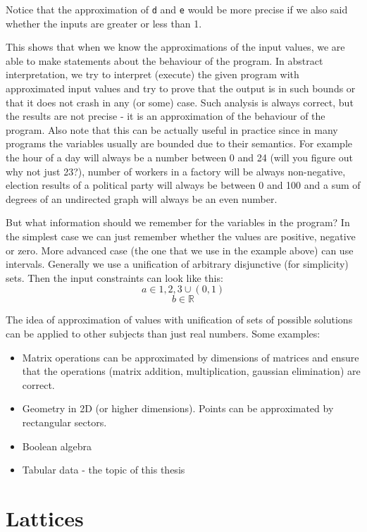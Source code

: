 Notice that the approximation of \verb|d| and \verb|e| would be more precise if we also said whether the inputs
are greater or less than 1.

This shows that when we know the approximations of the input values, we are able to make statements about the behaviour
of the program.
In abstract interpretation, we try to interpret (execute) the given program with approximated input values and try to
prove that the output is in such bounds or that it does not crash in any (or some) case.
Such analysis is always correct, but the results are not precise - it is an approximation of the behaviour of the program.
Also note that this can be actually useful in practice since in many programs the variables usually are bounded due to
their semantics.
For example the hour of a day will always be a number between 0 and 24 (will you figure out why not just 23?),
number of workers in a factory will be always non-negative, election results of a political party will always be
between 0 and 100 and a sum of degrees of an undirected graph will always be an even number.

But what information should we remember for the variables in the program?
In the simplest case we can just remember whether the values are positive, negative or zero.
More advanced case (the one that we use in the example above) can use intervals.
Generally we use a unification of arbitrary disjunctive (for simplicity) sets.
Then the input constraints can look like this:
\[a \in {1, 2, 3} \cup (0, 1)\]
\[b \in \mathbb{R}\]

The idea of approximation of values with unification of sets of possible solutions can be applied to other subjects than
just real numbers.
Some examples:
\begin{itemize}
    \item Matrix operations can be approximated by dimensions of matrices and ensure that the operations
    (matrix addition, multiplication, gaussian elimination) are correct.

    \item Geometry in 2D (or higher dimensions).
    Points can be approximated by rectangular sectors.

    \item Boolean algebra

    \item Tabular data - the topic of this thesis
\end{itemize}


\section{Lattices} %

